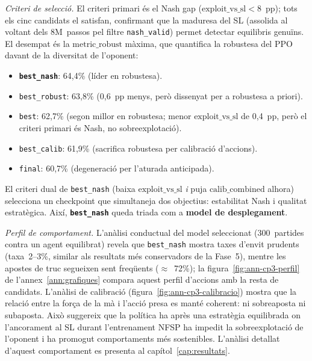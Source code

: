 \emph{Criteri de selecció.} El criteri primari és el Nash gap
(\(\text{exploit\_vs\_sl} < 8\)~pp); tots els cinc candidats el satisfan, confirmant que
la maduresa del \ac{SL} (assolida al voltant dels 8M~passos pel filtre \texttt{nash\_valid})
permet detectar equilibris genuïns. El desempat és la \(\text{metric\_robust}\) màxima,
que quantifica la robustesa del \ac{PPO} davant de la diversitat de l'oponent:

\begin{itemize}
  \item \textbf{\texttt{best\_nash}}: 64{,}4\% (líder en robustesa).
  \item \texttt{best\_robust}: 63{,}8\% (0{,}6~pp menys, però dissenyat per a robustesa a priori).
  \item \texttt{best}: 62{,}7\% (segon millor en robustesa; menor \(\text{exploit\_vs\_sl}\)
    de 0{,}4~pp, però el criteri primari és Nash, no sobreexplotació).
  \item \texttt{best\_calib}: 61{,}9\% (sacrifica robustesa per calibració d'accions).
  \item \texttt{final}: 60{,}7\% (degeneració per l'aturada anticipada).
\end{itemize}

El criteri dual de \texttt{best\_nash} (baixa \(\text{exploit\_vs\_sl}\) \emph{i} puja
\(\text{calib\_combined}\) alhora) selecciona un checkpoint que simultaneja dos objectius:
estabilitat Nash i qualitat estratègica. Així, \textbf{\texttt{best\_nash}} queda triada
com a \textbf{model de desplegament}.

\emph{Perfil de comportament.} L'anàlisi conductual del model seleccionat (300~partides
contra un agent equilibrat) revela que \texttt{best\_nash} mostra taxes d'envit prudents
(taxa~2--3\%, similar als resultats més conservadors de la Fase~5), mentre les apostes de
truc segueixen sent freqüents (\(\approx\)~72\%); la figura~\ref{fig:ann-cp3-perfil} de
l'annex~\ref{ann:grafiques} compara aquest perfil d'accions amb la resta de candidats.
L'anàlisi de calibració (figura~\ref{fig:ann-cp3-calibracio}) mostra que la relació entre la
força de la mà i l'acció presa es manté coherent: ni sobreaposta ni subaposta. Això suggereix que la política ha après una estratègia equilibrada on l'ancorament
al \ac{SL} durant l'entrenament \ac{NFSP} ha impedit la sobreexplotació de l'oponent i ha
promogut comportaments més sostenibles. L'anàlisi detallat d'aquest comportament es presenta
al capítol~\ref{cap:resultats}.

